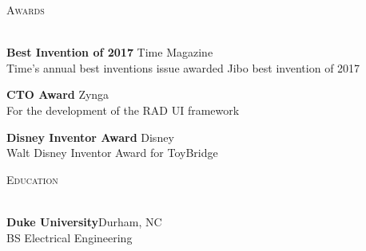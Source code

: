 \documentclass[a4paper]{article}
\newcommand{\lineunder} {
    \vspace*{-8pt} \\
    \hspace*{-18pt} \hrulefill \\
}
\newcommand{\header} [1] {
    {\hspace*{-18pt}\vspace*{6pt} \textsc{#1}}
    \vspace*{-6pt} \lineunder
    \vspace{2mm}
}
\begin{document}
\header{\faTrophy \hspace{1pt} Awards}

\textbf{Best Invention of 2017} \hfill Time Magazine\\
Time's annual best inventions issue awarded Jibo best invention of 2017
\vspace*{2mm}

\textbf{CTO Award} \hfill Zynga\\
For the development of the RAD UI framework 
\vspace*{2mm}

\textbf{Disney Inventor Award} \hfill Disney\\
Walt Disney Inventor Award for ToyBridge
\vspace*{4mm}

\header{\faGraduationCap \hspace{1pt} Education}
\textbf{Duke University}\hfill Durham, NC\\
BS Electrical Engineering\\
\vspace{4mm}
\end{document}
